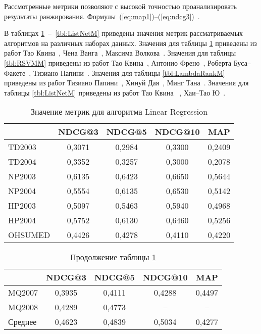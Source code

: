 Рассмотренные метрики позволяют с высокой точностью проанализировать результаты ранжирования. Формулы~(\ref{eq:map1})--(\ref{eq:ndcg3})~\cite{metrics}.

В таблицах \ref{tbl:LRM}~--~\ref{tbl:ListNetM} приведены значения метрик рассматриваемых алгоритмов на различных наборах данных.  Значения для таблицы \ref{tbl:LRM} приведены из работ Тао Квина~\cite{LETOR3}, Чена Ванга~\cite{LRM2}, Максима Волкова~\cite{LRM3}. Значения для таблицы \ref{tbl:RSVMM} приведены из работ Тао Квина~\cite{LETOR3}, Антонио Френо~\cite{AOL}, Роберта Буса--Факете~\cite{RSVMM1}, Тизиано Папини~\cite{RSVMM2}. Значения для таблицы \ref{tbl:LambdaRankM} приведены из работ Тизиано Папини~\cite{RSVMM2}, Хинуй Дая~\cite{LDRM1}, Минг Тана~\cite{LDRM2}. Значения для таблицы \ref{tbl:ListNetM} приведены из работ Тао Квина ~\cite{LETOR3}, Хаи--Тао Ю~\cite{LNM1}.

\begin{table}[!ht]
	\begin{center}
		\begin{threeparttable}
			\captionsetup{justification=raggedright,singlelinecheck=off}
			\caption{Значение метрик для алгоритма Linear Regression}
			\label{tbl:LRM}
			\begin{tabular}{|l|c|c|c|c|}
				\hline
				\makecell[c]{Датасет}& NDCG@3 & NDCG@5 & NDCG@10 & MAP \\\hline
				TD2003&	0,3071&	0,2984&	0,3300&	0,2409\\\hline
				TD2004&	0,3352&	0,3257&	0,3000&	0,2078\\\hline
				NP2003&	0,6135&	0,6423&	0,6650&	0,5644\\\hline
				NP2004&	0,5554&	0,6135&	0,6530&	0,5142\\\hline
				HP2003&	0,5097&	0,5463&	0,5940&	0,4968\\\hline
				HP2004&	0,5752&	0,6130&	0,6460&	0,5256\\\hline
				OHSUMED&	0,4426&	0,4278&	0,4110&	0,4220\\\hline
			\end{tabular}
		\end{threeparttable}
	\end{center}
\end{table}

\begin{table}[!ht]
	\begin{center}
		\begin{threeparttable}
			\captionsetup{justification=raggedright,singlelinecheck=off}
			\caption*{Продолжение таблицы \ref{tbl:LRM}}
			\begin{tabular}{|p{70pt}|c|c|c|c|}
				\hline
				\makecell[c]{Датасет}& NDCG@3 & NDCG@5 & NDCG@10 & MAP \\\hline
				MQ2007&	0,3935&	0,4111&	0,4288&	0,4497\\\hline
				MQ2008&	0,4289&	0,4773&	--&	--\\\hline
				Среднее& 0,4623&	0,4839&	0,5034&	0,4277\\\hline
			\end{tabular}
		\end{threeparttable}
	\end{center}
\end{table}

